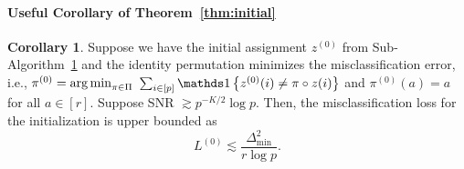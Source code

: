 \documentclass[lettersize,journal]{IEEEtran}
\theoremstyle{definition}
\newtheorem{cor}{Corollary}
\theoremstyle{definition}
\newcommand{\offf}[1]{\left\{#1\right\}}
\begin{document}
\paragraph{Useful Corollary of Theorem~\ref{thm:initial}} 

\begin{cor}\label{cor:L0} Suppose we have the initial assignment $z^{(0)}$ from Sub-Algorithm~\hyperref[alg:main]{1} and the identity permutation minimizes 
the misclassification error, i.e., $\pi^{(0)} = \operatorname*{arg\,min}_{\pi \in \Pi} $ $ \sum_{i \in [p]}\ind \offf{z^{(0)}(i) \neq \pi \circ z(i) }$ and $\pi^{(0)}(a) = a$ for all $ a \in [r]$. Suppose SNR $\gtrsim p^{-K/2} \log p$. Then, the misclassification loss for the initialization is upper bounded as 
\begin{equation}
    L^{(0)} \lesssim \frac{\Delta_{\min}^2}{r \log p}.
\end{equation}
\end{cor}
\end{document}
